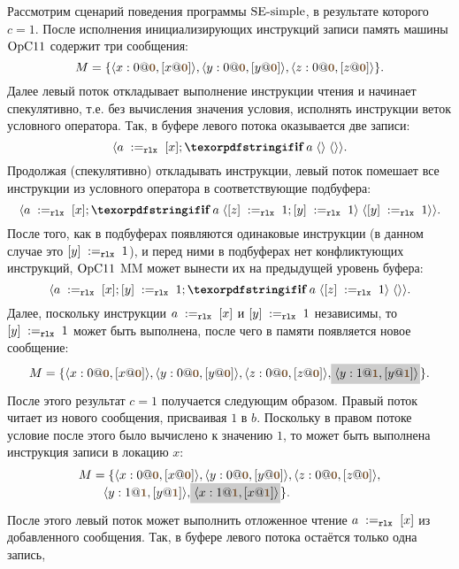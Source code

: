 Рассмотрим сценарий поведения программы ${\rm SE\text{-}simple}$, в результате которого $c = 1$.
После исполнения инициализирующих инструкций записи память машины $\mathrm{OpC11}$ содержит три сообщения:
\[
M = \{\angled{x:0@\tstamp{0}, [x@\tstamp{0}]}, \angled{y:0@\tstamp{0},[y@\tstamp{0}]},
      \angled{z:0@\tstamp{0},[z@\tstamp{0}]}\}.
\]
Далее левый поток откладывает выполнение инструкции чтения и начинает
спекулятивно, т.е. без вычисления значения условия, исполнять инструкции
веток условного оператора.
Так, в буфере левого потока оказывается две записи:
\[\angled{\readInstParam{\rlx}{a}{x}; \kw{if} \; a \; \angled{} \; \angled{}}.\]
Продолжая (спекулятивно) откладывать инструкции, левый поток помешает все инструкции из
условного оператора в соответствующие подбуфера:
\[\angled{\readInstParam{\rlx}{a}{x};
  \kw{if} \; a \; \angled{\writeInstParam{\rlx}{z}{1}; \writeInstParam{\rlx}{y}{1}} \;
  \angled{\writeInstParam{\rlx}{y}{1}}}.\]
После того, как в подбуферах появляются одинаковые инструкции
(в данном случае это $[y] \;:=_{\mathtt{rlx}}\;1$), и перед ними в подбуферах нет
конфликтующих инструкций, $\mathrm{OpC11}$ MM может вынести их на предыдущей уровень буфера:
\[\angled{\readInstParam{\rlx}{a}{x}; \writeInstParam{\rlx}{y}{1};
  \kw{if} \; a \; \angled{\writeInstParam{\rlx}{z}{1}} \;
  \angled{} }.\]
Далее, поскольку инструкции $a \;:=_{\mathtt{rlx}}\;[x]$ и $[y] \;:=_{\mathtt{rlx}}\;1$
независимы, то $[y] \;:=_{\mathtt{rlx}}\;1$
может быть выполнена, после чего в памяти появляется новое сообщение:
\[
\begin{array}{@{}l@{}}
M = \{\angled{x:0@\tstamp{0}, [x@\tstamp{0}]}, \angled{y:0@\tstamp{0},[y@\tstamp{0}]},
      \angled{z:0@\tstamp{0},[z@\tstamp{0}]}, \graybox{\angled{y:1@\tstamp{1},[y@\tstamp{1}]}}\}.
\end{array}
\]
После этого результат $c = 1$ получается следующим образом.
Правый поток читает из нового сообщения, присваивая $1$ в $b$.
Поскольку в правом потоке условие после этого было вычислено к значению $1$,
то может быть выполнена инструкция записи в локацию $x$:
\[
\begin{array}{@{}l@{}}
M = \{\angled{x:0@\tstamp{0}, [x@\tstamp{0}]}, \angled{y:0@\tstamp{0},[y@\tstamp{0}]}, \angled{z:0@\tstamp{0},[z@\tstamp{0}]}, \\
\qquad \angled{y:1@\tstamp{1},[y@\tstamp{1}]}, \graybox{\angled{x:1@\tstamp{1},[x@\tstamp{1}]}}\}.
\end{array}
\]
После этого левый поток может выполнить отложенное чтение $a \;:=_{\mathtt{rlx}}\;[x]$ из добавленного сообщения.
Так, в буфере левого потока остаётся только одна запись,
